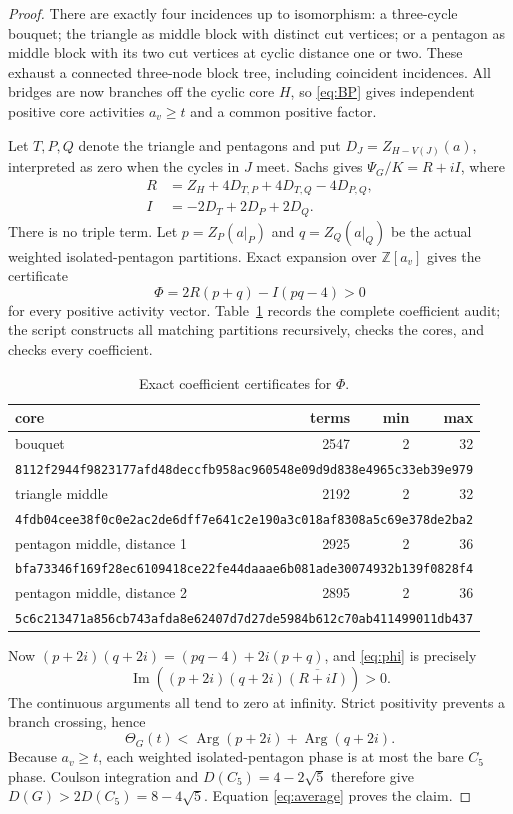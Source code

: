 \documentclass[11pt]{article}
\newcommand{\Arg}{\operatorname{Arg}}
\begin{document}
\begin{proof}
There are exactly four incidences up to isomorphism: a three-cycle bouquet;
the triangle as middle block with distinct cut vertices; or a pentagon as
middle block with its two cut vertices at cyclic distance one or two.  These
exhaust a connected three-node block tree, including coincident incidences.
All bridges are now branches off the cyclic core $H$, so \eqref{eq:BP} gives
independent positive core activities $a_v\geq t$ and a common positive factor.

Let $T,P,Q$ denote the triangle and pentagons and put
$D_J=Z_{H-V(J)}(a)$, interpreted as zero when the cycles in $J$ meet.  Sachs
gives $\Psi_G/K=R+iI$, where
\begin{align*}
 R&=Z_H+4D_{T,P}+4D_{T,Q}-4D_{P,Q},\\
 I&=-2D_T+2D_P+2D_Q.
\end{align*}
There is no triple term.  Let
$p=Z_P(a|_P)$ and $q=Z_Q(a|_Q)$ be the actual weighted isolated-pentagon
partitions.  Exact expansion over $\mathbb Z[a_v]$ gives the certificate
\begin{equation}\label{eq:phi}
 \Phi=2R(p+q)-I(pq-4)>0
\end{equation}
for every positive activity vector.  Table~\ref{tab:cert} records the complete
coefficient audit; the script constructs all matching partitions recursively,
checks the cores, and checks every coefficient.

\begin{table}[h]
\centering\small
\begin{tabular}{lrrr}
core & terms & min & max\\\hline
bouquet &2547&2&32\\
\multicolumn{4}{l}{\texttt{8112f2944f9823177afd48deccfb958ac960548e09d9d838e4965c33eb39e979}}\\[1mm]
triangle middle &2192&2&32\\
\multicolumn{4}{l}{\texttt{4fdb04cee38f0c0e2ac2de6dff7e641c2e190a3c018af8308a5c69e378de2ba2}}\\[1mm]
pentagon middle, distance 1&2925&2&36\\
\multicolumn{4}{l}{\texttt{bfa73346f169f28ec6109418ce22fe44daaae6b081ade30074932b139f0828f4}}\\[1mm]
pentagon middle, distance 2&2895&2&36\\
\multicolumn{4}{l}{\texttt{5c6c213471a856cb743afda8e62407d7d27de5984b612c70ab411499011db437}}\\
\end{tabular}
\caption{Exact coefficient certificates for $\Phi$.}\label{tab:cert}
\end{table}

Now $(p+2i)(q+2i)=(pq-4)+2i(p+q)$, and \eqref{eq:phi} is precisely
\[
 \operatorname{Im}((p+2i)(q+2i)\overline{(R+iI)})>0.
\]
The continuous arguments all tend to zero at infinity.  Strict positivity
prevents a branch crossing, hence
\[
 \Theta_G(t)<\Arg(p+2i)+\Arg(q+2i).
\]
Because $a_v\geq t$, each weighted isolated-pentagon phase is at most the bare
$C_5$ phase.  Coulson integration and
$D(C_5)=4-2\sqrt5$ therefore give
$D(G)>2D(C_5)=8-4\sqrt5$.  Equation \eqref{eq:average} proves the claim.
\end{proof}
\end{document}
